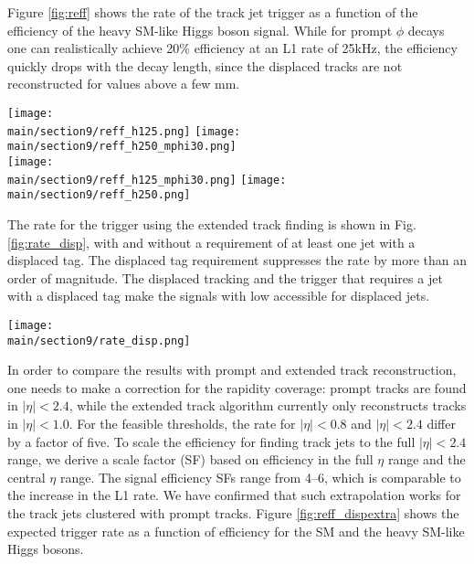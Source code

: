 Figure \ref{fig:reff} shows the rate of the track jet \HT trigger as a function of the efficiency
of the heavy SM-like Higgs boson signal. While for prompt $\phi$ decays one can realistically achieve 20\%
efficiency at an L1 rate of 25\unit{kHz}, the efficiency quickly drops with the decay length, since the displaced tracks are not reconstructed for \dtrans values above a few mm.

\begin{figure*}[hbtp]\centering

 \texttt{[image: \\main/section9/reff\_h125.png]}
 \texttt{[image: \\main/section9/reff\_h250\_mphi30.png]} \\
 \texttt{[image: \\main/section9/reff\_h125\_mphi30.png]}
\texttt{[image: \\main/section9/reff\_h250.png]}
 \caption{The rate of the track jet \HT trigger as a function of signal efficiency for the SM Higgs boson (left) and the heavy SM-like Higgs boson (right) using prompt track finding.}
  \label{fig:reff}
\end{figure*}%

The rate for the \HT trigger using the extended track finding is shown in Fig. \ref{fig:rate_disp}, with and without 
a requirement of at least one jet with a displaced tag. The displaced tag requirement suppresses the rate by more than
an order of magnitude. The displaced tracking and the trigger that requires a jet with a displaced tag make the signals with low \HT accessible for displaced jets.

\begin{figure*}[hbtp]\centering
 \texttt{[image: \\main/section9/rate\_disp.png]}
 \caption{The rate of the track jet \HT trigger using extended track finding with (solid line) and without (dashed line) a
 requirement of at least one jet with a displaced tag.}
  \label{fig:rate_disp}
\end{figure*}

In order to compare the results with prompt and extended track reconstruction, one needs to make a correction for
the rapidity coverage: prompt tracks are found in $|\eta|<2.4$, while the extended track algorithm currently only
reconstructs tracks in $|\eta|<1.0$.  For the feasible thresholds, the rate for $|\eta|<0.8$ and $|\eta|<2.4$ differ by a factor of five.  To scale the efficiency for finding track jets to the full
$|\eta|<2.4$ range, we derive a scale factor (SF) based on efficiency in the full $\eta$ range and the central $\eta$ range. The signal efficiency SFs range from 4--6, 
which is comparable to the increase in the L1 rate.
We have confirmed that such extrapolation works for the track jets clustered with prompt tracks. Figure \ref{fig:reff_dispextra} shows the expected trigger rate as a function of efficiency for the SM and the heavy SM-like Higgs bosons.

